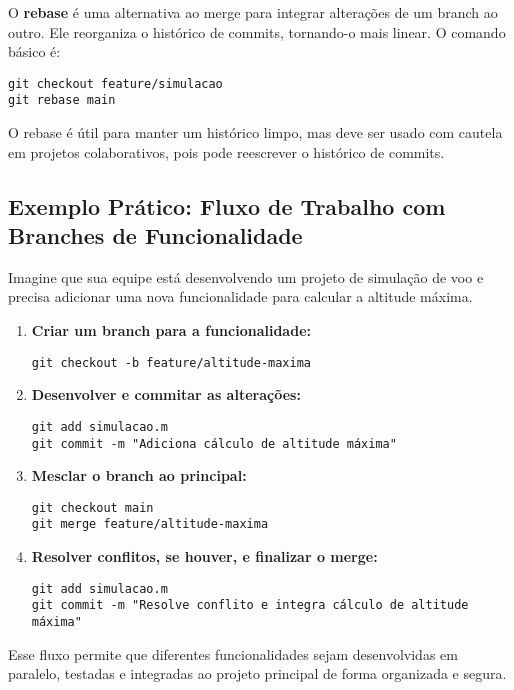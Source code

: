 O \textbf{rebase} é uma alternativa ao merge para integrar alterações de um branch ao outro. Ele reorganiza o histórico de commits, tornando-o mais linear. O comando básico é:

\begin{lstlisting}[style=shellstyle]
git checkout feature/simulacao
git rebase main
\end{lstlisting}

O rebase é útil para manter um histórico limpo, mas deve ser usado com cautela em projetos colaborativos, pois pode reescrever o histórico de commits.

\subsection{Exemplo Prático: Fluxo de Trabalho com Branches de Funcionalidade}

Imagine que sua equipe está desenvolvendo um projeto de simulação de voo e precisa adicionar uma nova funcionalidade para calcular a altitude máxima.

\begin{enumerate}
    \item \textbf{Criar um branch para a funcionalidade:}
    \begin{lstlisting}[style=shellstyle]
git checkout -b feature/altitude-maxima
    \end{lstlisting}
    \item \textbf{Desenvolver e commitar as alterações:}
    \begin{lstlisting}[style=shellstyle]
git add simulacao.m
git commit -m "Adiciona cálculo de altitude máxima"
    \end{lstlisting}
    \item \textbf{Mesclar o branch ao principal:}
    \begin{lstlisting}[style=shellstyle]
git checkout main
git merge feature/altitude-maxima
    \end{lstlisting}
    \item \textbf{Resolver conflitos, se houver, e finalizar o merge:}
    \begin{lstlisting}[style=shellstyle]
git add simulacao.m
git commit -m "Resolve conflito e integra cálculo de altitude máxima"
    \end{lstlisting}
\end{enumerate}

Esse fluxo permite que diferentes funcionalidades sejam desenvolvidas em paralelo, testadas e integradas ao projeto principal de forma organizada e segura.


